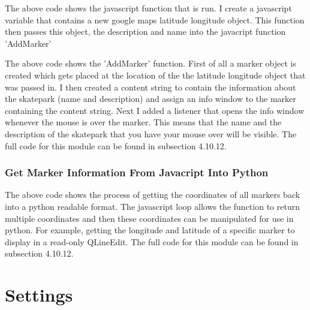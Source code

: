 \begin{landscape}

The above code shows the javascript function that is run. I create a javascript variable that contains a new google maps latitude longitude object. This function then passes this object, the description and name into the javacript function 'AddMarker'




The above code shows the 'AddMarker' function. First of all a marker object is created which gets placed at the location of the the latitude longitude object that was passed in. I then created a content string to contain the information about the skatepark (name and description) and assign an info window to the marker containing the content string. Next I added a listener that opens the info window whenever the mouse is over the marker. This means that the name and the description of the skatepark that you have your mouse over will be visible.  The full code for this module can be found in subsection 4.10.12.

\subsubsection{Get Marker Information From Javacript Into Python}


The above code shows the process of getting the coordinates of all markers back into a python readable format. The javascript loop allows the function to return multiple coordinates and then these coordinates can be manipulated for use in python. For example, getting the longitude and latitude of a specific marker to display in a read-only QLineEdit. The full code for this module can be found in subsection 4.10.12.



\end{landscape}










\section{Settings}

